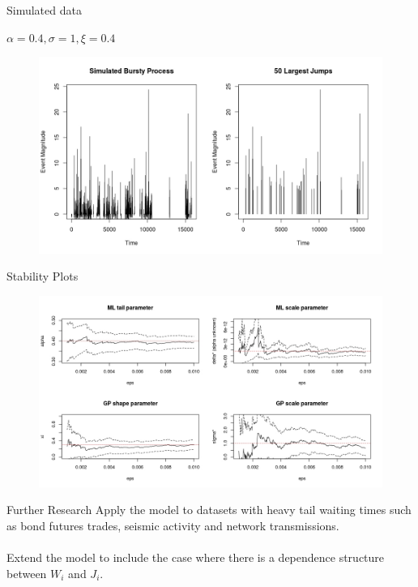 \documentclass{beamer}
\begin{document}
\begin{frame}{Simulated data}
    \begin{center}
        $\alpha=0.4, \sigma=1, \xi=0.4$
    \end{center}
	\begin{figure}
        \centering
        \vspace{-0.5cm}
        \hspace{-0.8cm}
        \includegraphics[scale=0.45]{SimulatedBursty.jpeg}
    \end{figure}
\end{frame}

\begin{frame}{Stability Plots}
    \begin{figure}
        \centering
        \vspace{-0.5cm}
        \hspace{-0cm}
        \includegraphics[scale=0.45]{Thesis/Figures/alphaUnknown}
    \end{figure}
\end{frame}


\begin{frame}{Further Research}
Apply the model to datasets with heavy tail waiting times such as bond futures trades, seismic activity and network transmissions.
\\~\\
Extend the model to include the case where there is a dependence structure between $W_i$ and $J_i$.
\end{frame}
 
\end{document}
